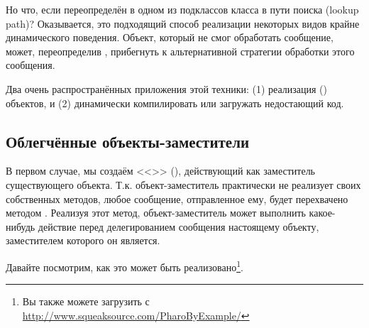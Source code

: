 \documentclass[a4paper,10pt,twoside]{book}
\begin{document}
Но что, если  переопределён в одном из подклассов класса  в пути поиска (lookup path)?
Оказывается, это подходящий способ реализации некоторых видов крайне динамического поведения. Объект, который не смог обработать сообщение, может, переопределив , прибегнуть к альтернативной стратегии обработки этого сообщения.

Два очень распространённых приложения этой техники: (1) реализация  () объектов, и (2) динамически компилировать или загружать недостающий код.

\subsection{Облегчённые объекты-заместители}

В первом случае, мы создаём <<>> (), действующий как заместитель существующего объекта.
Т.к. объект-заместитель практически не реализует своих собственных методов, любое сообщение, отправленное ему, будет перехвачено методом  . Реализуя этот метод, объект-заместитель может выполнить какое-нибудь действие перед делегированием сообщения настоящему объекту, заместителем которого он является.

Давайте посмотрим, как это может быть реализовано\footnote{Вы также можете загрузить  с \url{http://www.squeaksource.com/PharoByExample/}}.
\end{document}
